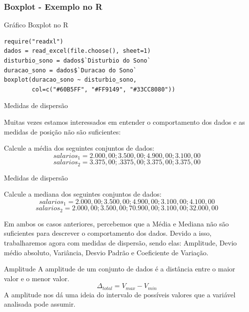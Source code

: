 \begin{frame}[fragile]
\frametitle{Boxplot - Exemplo no R}   
\begin{block}{Gráfico Boxplot no R}
\begin{verbatim}
require("readxl")
dados = read_excel(file.choose(), sheet=1) 
disturbio_sono = dados$`Disturbio do Sono`
duracao_sono = dados$`Duracao do Sono`
boxplot(duracao_sono ~ disturbio_sono,
        col=c("#60B5FF", "#FF9149", "#33CC8080"))
\end{verbatim}
\end{block}
\end{frame}
\begin{frame}{Medidas de dispersão}

Muitas vezes estamos interessados em entender o comportamento dos dados e as medidas de posição não são suficientes:

\begin{exemplo}
    Calcule a média dos seguintes conjuntos de dados:
    $$salarios_1 = 2.000,00 ; 3.500,00 ; 4.900,00 ; 3.100,00 $$
    $$salarios_2 = 3.375,00 ; .3375,00; 3.375,00; 3.375,00$$
\end{exemplo}
\end{frame}

\begin{frame}{Medidas de dispersão}
    \begin{exemplo}
        Calcule a mediana dos seguintes conjuntos de dados:
        $$salarios_1 = 2.000,00 ; 3.500,00 ; 4.900,00 ; 3.100,00; 4.100,00 $$
        $$salarios_2 = 2.000,00 ; 3.500,00 ; 70.900,00 ; 3.100,00; 32.000,00 $$
    \end{exemplo}
\end{frame}

\begin{frame}
Em ambos os casos anteriores, percebemos que a Média e Mediana não são suficientes para descrever o comportamento dos dados. Devido a isso, 
trabalharemos agora com medidas de dispersão, sendo elas: Amplitude, Devio médio absoluto, Variância, Desvio Padrão e Coeficiente de Variação.
\end{frame}


\begin{frame}{Amplitude}
    A amplitude de um conjunto de dados é a distância entre o maior valor e o menor valor.
    \pause
    $$\Delta_{total} = V_{max} - V_{min}$$
    \pause
    A amplitude nos dá uma ideia do intervalo de possíveis valores que a variável analisada pode assumir. 
\end{frame}


